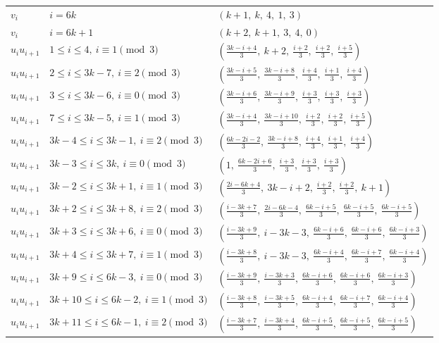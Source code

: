 \begin{longtable}{lll}
$v_i$ & $i = 6k$ & $(k+1,\ k,\ 4,\ 1,\ 3)$ \\
$v_i$ & $i = 6k+1$ & $(k+2,\ k+1,\ 3,\ 4,\ 0)$ \\
$u_i u_{i+1}$ & $1 \le i \le 4,\ i \equiv 1 \pmod{3}$ & $(\frac{3k-i+4}{3},\ k+2,\ \frac{i+2}{3},\ \frac{i+2}{3},\ \frac{i+5}{3})$ \\
$u_i u_{i+1}$ & $2 \le i \le 3k-7,\ i \equiv 2 \pmod{3}$ & $(\frac{3k-i+5}{3},\ \frac{3k-i+8}{3},\ \frac{i+4}{3},\ \frac{i+1}{3},\ \frac{i+4}{3})$ \\
$u_i u_{i+1}$ & $3 \le i \le 3k-6,\ i \equiv 0 \pmod{3}$ & $(\frac{3k-i+6}{3},\ \frac{3k-i+9}{3},\ \frac{i+3}{3},\ \frac{i+3}{3},\ \frac{i+3}{3})$ \\
$u_i u_{i+1}$ & $7 \le i \le 3k-5,\ i \equiv 1 \pmod{3}$ & $(\frac{3k-i+4}{3},\ \frac{3k-i+10}{3},\ \frac{i+2}{3},\ \frac{i+2}{3},\ \frac{i+5}{3})$ \\
$u_i u_{i+1}$ & $3k-4 \le i \le 3k-1,\ i \equiv 2 \pmod{3}$ & $(\frac{6k-2i-2}{3},\ \frac{3k-i+8}{3},\ \frac{i+4}{3},\ \frac{i+1}{3},\ \frac{i+4}{3})$ \\
$u_i u_{i+1}$ & $3k-3 \le i \le 3k,\ i \equiv 0 \pmod{3}$ & $(1,\ \frac{6k-2i+6}{3},\ \frac{i+3}{3},\ \frac{i+3}{3},\ \frac{i+3}{3})$ \\
$u_i u_{i+1}$ & $3k-2 \le i \le 3k+1,\ i \equiv 1 \pmod{3}$ & $(\frac{2i-6k+4}{3},\ 3k-i+2,\ \frac{i+2}{3},\ \frac{i+2}{3},\ k+1)$ \\
$u_i u_{i+1}$ & $3k+2 \le i \le 3k+8,\ i \equiv 2 \pmod{3}$ & $(\frac{i-3k+7}{3},\ \frac{2i-6k-4}{3},\ \frac{6k-i+5}{3},\ \frac{6k-i+5}{3},\ \frac{6k-i+5}{3})$ \\
$u_i u_{i+1}$ & $3k+3 \le i \le 3k+6,\ i \equiv 0 \pmod{3}$ & $(\frac{i-3k+9}{3},\ i-3k-3,\ \frac{6k-i+6}{3},\ \frac{6k-i+6}{3},\ \frac{6k-i+3}{3})$ \\
$u_i u_{i+1}$ & $3k+4 \le i \le 3k+7,\ i \equiv 1 \pmod{3}$ & $(\frac{i-3k+8}{3},\ i-3k-3,\ \frac{6k-i+4}{3},\ \frac{6k-i+7}{3},\ \frac{6k-i+4}{3})$ \\
$u_i u_{i+1}$ & $3k+9 \le i \le 6k-3,\ i \equiv 0 \pmod{3}$ & $(\frac{i-3k+9}{3},\ \frac{i-3k+3}{3},\ \frac{6k-i+6}{3},\ \frac{6k-i+6}{3},\ \frac{6k-i+3}{3})$ \\
$u_i u_{i+1}$ & $3k+10 \le i \le 6k-2,\ i \equiv 1 \pmod{3}$ & $(\frac{i-3k+8}{3},\ \frac{i-3k+5}{3},\ \frac{6k-i+4}{3},\ \frac{6k-i+7}{3},\ \frac{6k-i+4}{3})$ \\
$u_i u_{i+1}$ & $3k+11 \le i \le 6k-1,\ i \equiv 2 \pmod{3}$ & $(\frac{i-3k+7}{3},\ \frac{i-3k+4}{3},\ \frac{6k-i+5}{3},\ \frac{6k-i+5}{3},\ \frac{6k-i+5}{3})$ \\

\end{longtable}
